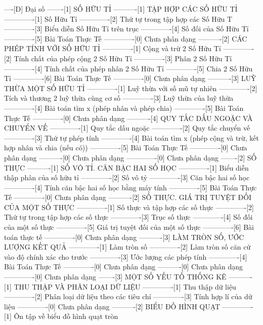 ----[D] Đại số
-------[1] SỐ HỮU TỈ
----------[1] TẬP HỢP CÁC SỐ HỮU TỈ 
-------------[1] Số Hữu Tỉ
-------------[2] Thứ tự trong tập hợp các Số Hữu T
-------------[3] Biểu diễn Số Hữu Tỉ trên trục
-------------[4] Số đối của Số Hữu Tỉ
-------------[5] Bài Toán Thực Tế
-------------[0] Chưa phân dạng
----------[2] CÁC PHÉP TÍNH VỚI SỐ HỮU TỈ
-------------[1] Cộng và trừ 2 Số Hữu Tỉ
-------------[2] Tính chất của phép cộng 2 Số Hữu Tỉ
-------------[3] Phân 2 Số Hữu Tỉ
-------------[4] Tính chất của phép nhân 2 Số Hữu Tỉ
-------------[5] Chia 2 Số Hữu Tỉ
-------------[6] Bài Toán Thực Tế
-------------[0] Chưa phân dạng
----------[3] LUỸ THỪA MỘT SỐ HỮU TỈ
-------------[1] Luỹ thừa với số mũ tự nhiên
-------------[2] Tích và thương 2 luỹ thừa cùng cơ số
-------------[3] Luỹ thừa của luỹ thừa
-------------[4] Bài toán tìm x (phép nhân và phép chia)
-------------[5] Bài Toán Thực Tế
-------------[0] Chưa phân dạng
----------[4] QUY TẮC DẤU NGOẶC VÀ CHUYỂN VẾ
-------------[1] Quy tắc dấu ngoặc
-------------[2] Quy tắc chuyển vế
-------------[3] Thứ tự phép tính
-------------[4] Bài toán tìm x (phép cộng và trừ, kết hợp nhân và chia (nếu có))
-------------[5] Bài Toán Thực Tế
-------------[0] Chưa phân dạng
----------[0] Chưa phân dạng
-------------[0] Chưa phân dạng
-------[2] SỐ THỰC
----------[1] SỐ VÔ TỈ. CĂN BẬC HAI SỐ HỌC
-------------[1] Biểu diễn thập phân của số hữu tỉ
-------------[2] Số vô tỷ
-------------[3] Căn bậc hai số học
-------------[4] Tính căn bậc hai số học bằng máy tính
-------------[5] Bài Toán Thực Tế
-------------[0] Chưa phân dạng
----------[2] SỐ THỰC. GIÁ TRỊ TUYỆT ĐỐI CỦA MỘT SỐ THỰC
-------------[1] Số thực và tập hợp các số thực
-------------[2] Thứ tự trong tập hợp các số thực
-------------[3] Trục số thực
-------------[4] Số đối của một số thực
-------------[5] Giá trị tuyệt đối của một số thực
-------------[6] Bài toán thực tế
-------------[0] Chưa phân dạng
----------[3] LÀM TRÒN SỐ, ƯỚC LƯỢNG KẾT QUẢ
-------------[1] Làm tròn số
-------------[2] Làm tròn số căn cứ vào độ chính xác cho trước
-------------[3] Ước lượng các phép tính
-------------[4] Bài Toán Thực Tế
-------------[0] Chưa phân dạng
----------[0] Chưa phân dạng
-------------[0] Chưa phân dạng
-------[3] MỘT SỐ YẾU TỐ THỐNG KÊ
----------[1] THU THẬP VÀ PHÂN LOẠI DỮ LIỆU
-------------[1] Thu thập dữ liệu
-------------[2] Phân loại dữ liệu theo các tiêu chí
-------------[3] Tính hợp lí của dữ liệu
-------------[0] Chưa phân dạng
----------[2] BIỂU ĐỒ HÌNH QUẠT
-------------[1] Ôn tập về biểu đồ hình quạt tròn
